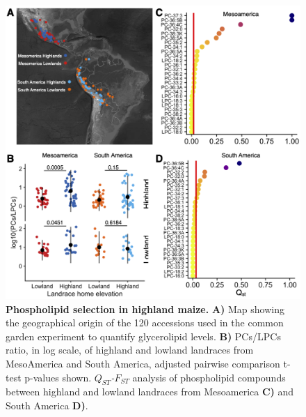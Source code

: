 \documentclass[9pt,twocolumn,twoside,lineno]{BioRxiv}
\begin{document}
\begin{figure}[!ht]
\begin{center}
\includegraphics[width=0.4\paperwidth]{Figures/Fig_1.png}
\caption{\textbf{Phospholipid selection in highland maize.} 
\textbf{A)} Map showing the geographical origin of the 120 accessions used in the common garden experiment to quantify glycerolipid levels.
\textbf{B)} PCs/LPCs ratio, in log scale, of highland and lowland landraces from MesoAmerica and South America, adjusted pairwise comparison t-test p-values shown.
\textit{$Q_{ST}$-$F_{ST}$} analysis of phospholipid compounds between highland and lowland landraces from Mesoamerica \textbf{C)} and South America \textbf{D)}.
} 
\label{Fig1}
\end{center}
\end{figure}
\end{document}
